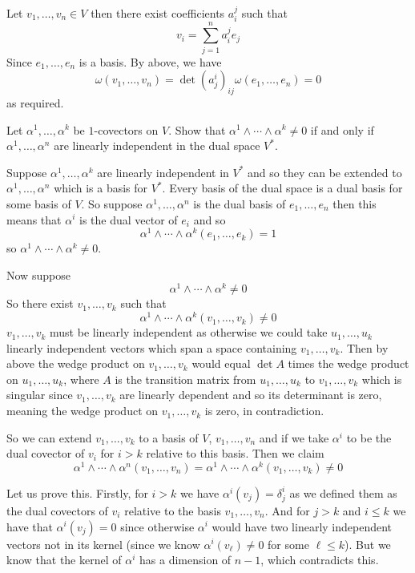 \documentclass[10pt]{article}
\begin{document}
Let $v_1,\dots,v_n\in V$ then there exist coefficients $a^j_i$ such that
\[ v_i = \sum_{j=1}^n a^j_i e_j \]
Since $e_1,\dots,e_n$ is a basis.
By above, we have
\[ \omega(v_1,\dots,v_n) = \det(a^i_j)_{ij}\omega(e_1,\dots,e_n) = 0 \]
as required.

\begin{exercise*}

    Let $\alpha^1,\dots,\alpha^k$ be $1$-covectors on $V$.
    Show that $\alpha^1\wedge\cdots\wedge\alpha^k\neq0$ if and only if $\alpha^1,\dots,\alpha^n$ are linearly independent in the dual space $V^*$.

\end{exercise*}

Suppose $\alpha^1,\dots,\alpha^k$ are linearly independent in $V^*$ and so they can be extended to $\alpha^1,\dots,\alpha^n$ which is a basis for $V^*$.
Every basis of the dual space is a dual basis for some basis of $V$.
So suppose $\alpha^1,\dots,\alpha^n$ is the dual basis of $e_1,\dots,e_n$ then this means that $\alpha^i$ is the dual vector of $e_i$ and so
\[ \alpha^1\wedge\cdots\wedge\alpha^k(e_1,\dots,e_k) = 1 \]
so $\alpha^1\wedge\cdots\wedge\alpha^k\neq0$.

Now suppose
\[ \alpha^1\wedge\cdots\wedge\alpha^k\neq0 \]
So there exist $v_1,\dots,v_k$ such that
\[ \alpha^1\wedge\cdots\wedge\alpha^k(v_1,\dots,v_k)\neq0 \]
$v_1,\dots,v_k$ must be linearly independent as otherwise we could take $u_1,\dots,u_k$ linearly independent vectors which span a space containing $v_1,\dots,v_k$.
Then by above the wedge product on $v_1,\dots,v_k$ would equal $\det A$ times the wedge product on $u_1,\dots,u_k$, where $A$ is the transition matrix from $u_1,\dots,u_k$ to $v_1,\dots,v_k$ which is
singular since $v_1,\dots,v_k$ are linearly dependent and so its determinant is zero, meaning the wedge product on $v_1,\dots,v_k$ is zero, in contradiction.

So we can extend $v_1,\dots,v_k$ to a basis of $V$, $v_1,\dots,v_n$ and if we take $\alpha^i$ to be the dual covector of $v_i$ for $i>k$ relative to this basis.
Then we claim
\[ \alpha^1\wedge\cdots\wedge\alpha^n(v_1,\dots,v_n) = \alpha^1\wedge\cdots\wedge\alpha^k(v_1,\dots,v_k) \neq 0 \]

Let us prove this.
Firstly, for $i>k$ we have $\alpha^i(v_j)=\delta^i_j$ as we defined them as the dual covectors of $v_i$ relative to the basis $v_1,\dots,v_n$.
And for $j>k$ and $i\leq k$ we have that $\alpha^i(v_j)=0$ since otherwise $\alpha^i$ would have two linearly independent vectors not in its kernel (since we know $\alpha^i(v_\ell)\neq0$ for some
$\ell\leq k$).
But we know that the kernel of $\alpha^i$ has a dimension of $n-1$, which contradicts this.
\end{document}
